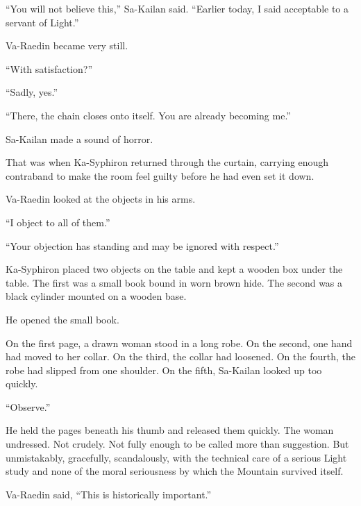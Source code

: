“You will not believe this,” Sa-Kailan said.
“Earlier today, I said acceptable to a servant of Light.”\par
Va-Raedin became very still.\par
“With satisfaction?”\par
“Sadly, yes.”\par
“There, the chain closes onto itself.
You are already becoming me.”\par

Sa-Kailan made a sound of horror.\par

That was when Ka-Syphiron returned through the curtain, carrying enough contraband to make the room feel guilty before he had even set it down.\par




Va-Raedin looked at the objects in his arms.\par

“I object to all of them.”\par
“Your objection has standing and may be ignored with respect.”\par

Ka-Syphiron placed two objects on the table and kept a wooden box under the table.
The first was a small book bound in worn brown hide.
The second was a black cylinder mounted on a wooden base.\par

He opened the small book.\par

On the first page, a drawn woman stood in a long robe.
On the second, one hand had moved to her collar.
On the third, the collar had loosened.
On the fourth, the robe had slipped from one shoulder.
On the fifth, Sa-Kailan looked up too quickly.\par

“Observe.”\par

He held the pages beneath his thumb and released them quickly.
The woman undressed.
Not crudely.
Not fully enough to be called more than suggestion.
But unmistakably, gracefully, scandalously, with the technical care of a serious Light study and none of the moral seriousness by which the Mountain survived itself.\par

Va-Raedin said, “This is historically important.”\par

